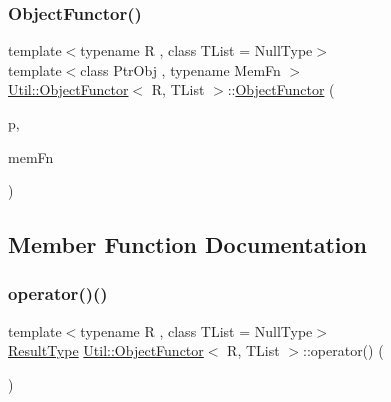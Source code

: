 \subsubsection{\texorpdfstring{ObjectFunctor()}{ObjectFunctor()}\hspace{0.1cm}{\footnotesize\ttfamily [15/15]}}
{\footnotesize\ttfamily template$<$typename R , class T\+List  = Null\+Type$>$ \\
template$<$class Ptr\+Obj , typename Mem\+Fn $>$ \\
\mbox{\hyperlink{classUtil_1_1ObjectFunctor}{Util\+::\+Object\+Functor}}$<$ R, T\+List $>$\+::\mbox{\hyperlink{classUtil_1_1ObjectFunctor}{Object\+Functor}} (\begin{DoxyParamCaption}\item[{const Ptr\+Obj \&}]{p,  }\item[{Mem\+Fn}]{mem\+Fn }\end{DoxyParamCaption})\hspace{0.3cm}{\ttfamily [inline]}}



\subsection{Member Function Documentation}
\mbox{\label{classUtil_1_1ObjectFunctor_a47ff83bbdf075aefe2ee26aafafd88a1}} 
\subsubsection{\texorpdfstring{operator()()}{operator()()}\hspace{0.1cm}{\footnotesize\ttfamily [1/18]}}
{\footnotesize\ttfamily template$<$typename R , class T\+List  = Null\+Type$>$ \\
\mbox{\hyperlink{classUtil_1_1ObjectFunctor_a77f816e98108848347d0dfc085090a1c}{Result\+Type}} \mbox{\hyperlink{classUtil_1_1ObjectFunctor}{Util\+::\+Object\+Functor}}$<$ R, T\+List $>$\+::operator() (\begin{DoxyParamCaption}{ }\end{DoxyParamCaption})\hspace{0.3cm}{\ttfamily [inline]}}

\mbox{\label{classUtil_1_1ObjectFunctor_a47ff83bbdf075aefe2ee26aafafd88a1}} 
